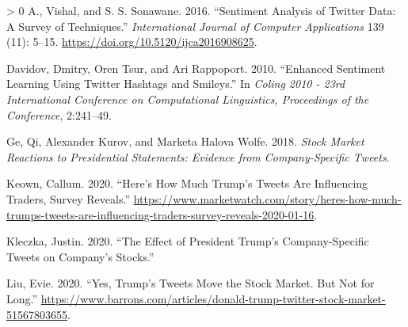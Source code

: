 \documentclass[
]{article}
\newlength{\cslhangindent}
\newenvironment{CSLReferences}[3] %
 {%
  \setlength{\parindent}{0pt}
  \ifodd #1 \everypar{\setlength{\hangindent}{\cslhangindent}}\ignorespaces\fi
  \ifnum #2 > 0
  \setlength{\parskip}{#3\baselineskip}
  \fi
 }%
 {}
\begin{document}
\begingroup
\setlength{\parindent}{-0.5in}
\setlength{\leftskip}{0.5in}

\hypertarget{refs}{}
\begin{CSLReferences}{1}{0}
\leavevmode\hypertarget{ref-A__2016}{}%
A., Vishal, and S. S. Sonawane. 2016. {``Sentiment Analysis of Twitter
Data: A Survey of Techniques.''} \emph{International Journal of Computer
Applications} 139 (11): 5--15.
\url{https://doi.org/10.5120/ijca2016908625}.

\leavevmode\hypertarget{ref-inproceedings}{}%
Davidov, Dmitry, Oren Tsur, and Ari Rappoport. 2010. {``Enhanced
Sentiment Learning Using Twitter Hashtags and Smileys.''} In
\emph{Coling 2010 - 23rd International Conference on Computational
Linguistics, Proceedings of the Conference}, 2:241--49.

\leavevmode\hypertarget{ref-ge2018stock}{}%
Ge, Qi, Alexander Kurov, and Marketa Halova Wolfe. 2018. \emph{Stock
Market Reactions to Presidential Statements: Evidence from
Company-Specific Tweets}.

\leavevmode\hypertarget{ref-Keown2020survey}{}%
Keown, Callum. 2020. {``Here's How Much Trump's Tweets Are Influencing
Traders, Survey Reveals.''}
\url{https://www.marketwatch.com/story/heres-how-much-trumps-tweets-are-influencing-traders-survey-reveals-2020-01-16}.

\leavevmode\hypertarget{ref-kleczka2020effect}{}%
Kleczka, Justin. 2020. {``The Effect of President Trump's
Company-Specific Tweets on Company's Stocks.''}

\leavevmode\hypertarget{ref-Liu2019trump}{}%
Liu, Evie. 2020. {``Yes, Trump's Tweets Move the Stock Market. But Not
for Long.''}
\url{https://www.barrons.com/articles/donald-trump-twitter-stock-market-51567803655}.

\end{CSLReferences}

\endgroup

                 

\end{document}
